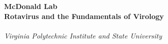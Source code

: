 \begin{titlepage}
	{~ \\[5cm] }
	
	\noindent \HRule \\[0.4cm]
	{ \Huge \bfseries McDonald Lab \\[0.4cm] }
	{ \huge \bfseries Rotavirus and the Fundamentals of Virology \\ }
	\HRule \\[0.4cm]
	
	{ \large \emph{Virginia Polytechnic Institute and State University} }
\end{titlepage}